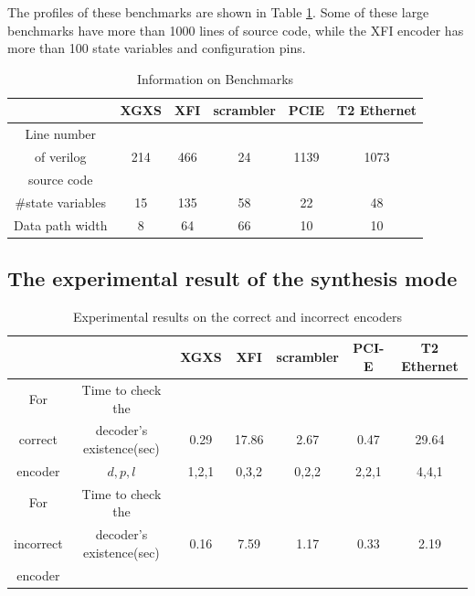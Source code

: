 \documentclass[runningheads,a4paper,orivec]{llncs}
\begin{document}
The profiles of these benchmarks are shown in Table \ref{tab_benchmark}.
Some of these large benchmarks have more than 1000 lines of source code,
while the XFI encoder has more than 100 state variables and configuration pins.


\begin{table}[t]
\centering
\caption{Information on Benchmarks}
\begin{tabular}{|c|c|c|c|c|c|}
\hline
&XGXS&XFI&scrambler&PCIE&T2 Ethernet\\\hline\hline
Line number&&&&&\\
of verilog&214&466&24&1139&1073\\
source code&&&&&\\\hline
\#state variables&15&135&58&22&48\\\hline
Data path width&8&64&66&10&10\\\hline
\end{tabular}\label{tab_benchmark}
\end{table}

\subsection{The experimental result of the synthesis mode}
\begin{table}[t]
\centering
\caption{Experimental results on the correct and incorrect encoders}
\begin{tabular}{|c|c|c|c|c|c|c|}
\hline
&                                        &XGXS     &XFI       &scrambler     &PCI-E    &T2 Ethernet\\ \hline\hline
% 
For &Time to check the                         &&&&&\\
correct&decoder's existence(sec)                      &0.29     &17.86     &2.67      &0.47    &29.64\\\cline{2-7}
encoder&$d,p,l$                                 &1,2,1    &0,3,2     &0,2,2     &2,2,1   &4,4,1          \\ \hline\hline
For&Time to check the                          &&&&&\\
incorrect&decoder's existence(sec)             &0.16     &7.59     &1.17      &0.33    &2.19\\
encoder&                        &&&&&\\\hline

\end{tabular}\label{tab_prodes}
\end{table}
\end{document}
